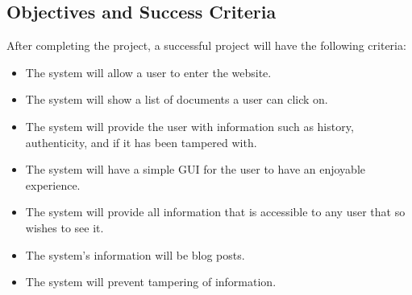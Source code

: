 \subsection{Objectives and Success Criteria}

After completing the project, a successful project will have the following criteria:
\begin{itemize}
	\item The system will allow a user to enter the website.
	\item The system will show a list of documents a user can click on.
	\item The system will provide the user with information such as history, authenticity, and if it has been tampered with.
	\item The system will have a simple GUI for the user to have an enjoyable experience.
	\item The system will provide all information that is accessible to any user that so wishes to see it.
	\item The system's information will be blog posts.
	\item The system will prevent tampering of information.
\end{itemize}
